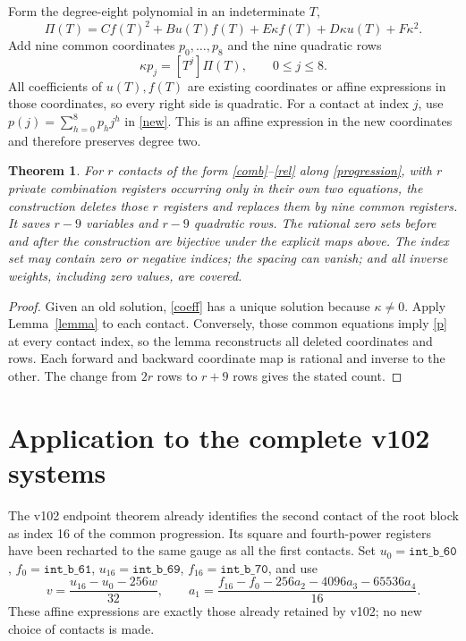 \documentclass[11pt]{article}
\newtheorem{theorem}{Theorem}
\begin{document}
Form the degree-eight polynomial in an indeterminate $T$,
\begin{equation}\label{common}
 \Pi(T)=C f(T)^2+B u(T)f(T)+E\kappa f(T)
                          +D\kappa u(T)+F\kappa^2.
\end{equation}
Add nine common coordinates $p_0,\ldots,p_8$ and the nine quadratic rows
\begin{equation}\label{coeff}
                      \kappa p_j=[T^j]\Pi(T),\qquad 0\le j\le8.
\end{equation}
All coefficients of $u(T),f(T)$ are existing coordinates or affine
expressions in those coordinates, so every right side is quadratic.
For a contact at index $j$, use $p(j)=\sum_{h=0}^8p_hj^h$ in
\eqref{new}. This is an affine expression in the new coordinates and
therefore preserves degree two.

\begin{theorem}\label{general}
For $r$ contacts of the form \eqref{comb}--\eqref{rel} along
\eqref{progression}, with $r$ private combination registers occurring
only in their own two equations, the construction deletes those $r$
registers and replaces them by nine common registers. It saves $r-9$
variables and $r-9$ quadratic rows. The rational zero sets before and
after the construction are bijective under the explicit maps above.
The index set may contain zero or negative indices; the spacing can
vanish; and all inverse weights, including zero values, are covered.
\end{theorem}
\begin{proof}
Given an old solution, \eqref{coeff} has a unique solution because
$\kappa\ne0$. Apply Lemma~\ref{lemma} to each contact. Conversely,
those common equations imply \eqref{p} at every contact index, so the
lemma reconstructs all deleted coordinates and rows. Each forward and
backward coordinate map is rational and inverse to the other. The
change from $2r$ rows to $r+9$ rows gives the stated count.
\end{proof}

\section{Application to the complete v102 systems}

The v102 endpoint theorem \cite{endpoint} already identifies the second
contact of the root block as index 16 of the common progression. Its
square and fourth-power registers have been recharted to the same
gauge as all the first contacts. Set $u_0=\mathtt{int\_b\_60}$,
$f_0=\mathtt{int\_b\_61}$,
$u_{16}=\mathtt{int\_b\_69}$,
$f_{16}=\mathtt{int\_b\_70}$, and use
\[
 v=\frac{u_{16}-u_0-256w}{32},\qquad
 a_1=\frac{f_{16}-f_0-256a_2-4096a_3-65536a_4}{16}.
\]
These affine expressions are exactly those already retained by v102;
no new choice of contacts is made.
\end{document}
